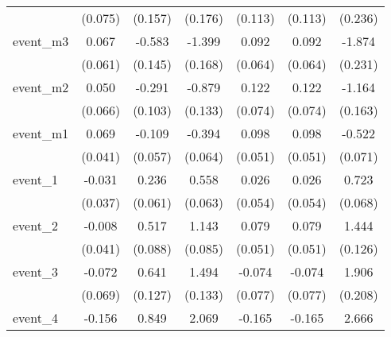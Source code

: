 {\begin{tabular}{l*{6}{c}}
            &     (0.075)         &     (0.157)         &     (0.176)         &     (0.113)         &     (0.113)         &     (0.236)         \\
[1em]
event\_m3    &       0.067         &      -0.583\sym{***}&      -1.399\sym{***}&       0.092         &       0.092         &      -1.874\sym{***}\\
            &     (0.061)         &     (0.145)         &     (0.168)         &     (0.064)         &     (0.064)         &     (0.231)         \\
[1em]
event\_m2    &       0.050         &      -0.291\sym{**} &      -0.879\sym{***}&       0.122         &       0.122         &      -1.164\sym{***}\\
            &     (0.066)         &     (0.103)         &     (0.133)         &     (0.074)         &     (0.074)         &     (0.163)         \\
[1em]
event\_m1    &       0.069         &      -0.109         &      -0.394\sym{***}&       0.098         &       0.098         &      -0.522\sym{***}\\
            &     (0.041)         &     (0.057)         &     (0.064)         &     (0.051)         &     (0.051)         &     (0.071)         \\
[1em]
event\_1     &      -0.031         &       0.236\sym{***}&       0.558\sym{***}&       0.026         &       0.026         &       0.723\sym{***}\\
            &     (0.037)         &     (0.061)         &     (0.063)         &     (0.054)         &     (0.054)         &     (0.068)         \\
[1em]
event\_2     &      -0.008         &       0.517\sym{***}&       1.143\sym{***}&       0.079         &       0.079         &       1.444\sym{***}\\
            &     (0.041)         &     (0.088)         &     (0.085)         &     (0.051)         &     (0.051)         &     (0.126)         \\
[1em]
event\_3     &      -0.072         &       0.641\sym{***}&       1.494\sym{***}&      -0.074         &      -0.074         &       1.906\sym{***}\\
            &     (0.069)         &     (0.127)         &     (0.133)         &     (0.077)         &     (0.077)         &     (0.208)         \\
[1em]
event\_4     &      -0.156         &       0.849\sym{***}&       2.069\sym{***}&      -0.165         &      -0.165         &       2.666\sym{***}\\

\end{tabular}}
